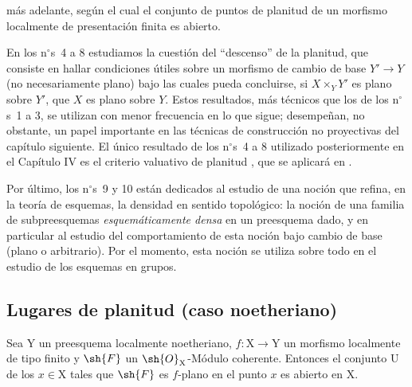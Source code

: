 más adelante, según el cual el conjunto de puntos de planitud de un morfismo
localmente de presentación finita es abierto.

En los n$^\circ$s~4 a 8 estudiamos la cuestión del ``descenso'' de la
planitud, que consiste en hallar condiciones útiles sobre un morfismo de cambio
de base $Y'\to Y$ (no necesariamente plano) bajo las cuales pueda concluirse,
si $X\times_YY'$ es plano sobre $Y'$, que $X$ es plano sobre $Y$. Estos resultados,
más técnicos que los de los n$^\circ$s~1 a 3, se utilizan con menor frecuencia
en lo que sigue; desempeñan, no obstante, un papel importante en las técnicas de
construcción no proyectivas del capítulo siguiente. El único resultado de los
n$^\circ$s~4 a 8 utilizado posteriormente en el Capítulo IV es el criterio valuativo
de planitud , que se aplicará en .

Por último, los n$^\circ$s~9 y 10 están dedicados al estudio de una noción que
refina, en la teoría de esquemas, la densidad en sentido topológico: la noción de
una familia de subpreesquemas \emph{esquemáticamente densa} en un preesquema dado,
y en particular al estudio del comportamiento de esta noción bajo cambio de base
(plano o arbitrario). Por el momento, esta noción se utiliza sobre todo en el
estudio de los esquemas en grupos.


\subsection{Lugares de planitud (caso noetheriano)}
\label{subsection:IV.11.1}

\begin{theorem}[11.1.1]
\label{IV.11.1.1}
Sea $\mathrm{Y}$ un preesquema localmente noetheriano, $f:\mathrm{X}\to\mathrm{Y}$ un morfismo localmente de tipo finito y $\sh{F}$ un $\sh{O}_\mathrm{X}$-Módulo coherente. Entonces el conjunto $\mathrm{U}$ de los $x\in\mathrm{X}$ tales que $\sh{F}$ es $f$-plano en el punto $x$ es abierto en $\mathrm{X}$.
\end{theorem}

